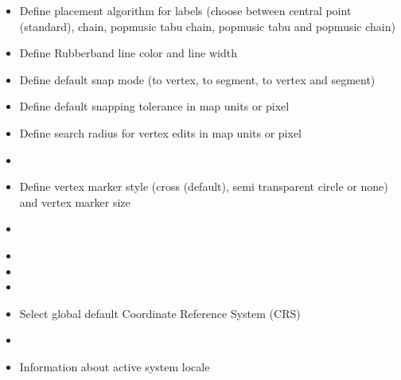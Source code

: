 
\begin{itemize}
\item Define placement algorithm for labels (choose between central point
(standard), chain, popmusic tabu chain, popmusic tabu and popmusic chain)
\end{itemize}


\begin{itemize}
\item Define Rubberband line color and line width
\item Define default snap mode (to vertex, to segment, to vertex and segment)
\item Define default snapping tolerance in map units or pixel
\item Define search radius for vertex edits in map units or pixel
\item {}
\item Define vertex marker style (cross (default), semi transparent circle or
none) and vertex marker size
\item {}
\end{itemize}


\begin{itemize}
\item {}
\item {}
\item {}
\item Select global default Coordinate Reference System (CRS)
\end{itemize}


\begin{itemize}
\item {}
\item Information about active system locale
\end{itemize}


